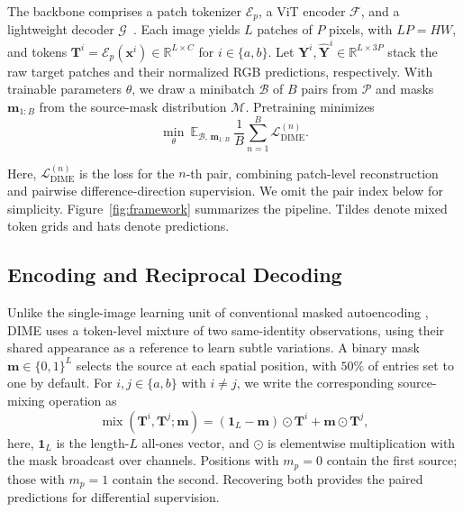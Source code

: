 \documentclass[10pt,journal,compsoc]{IEEEtran}
\begin{document}
The backbone comprises a patch tokenizer $\mathcal{E}_{p}$, a ViT encoder $\mathcal{F}$, and a lightweight decoder $\mathcal{G}$~\cite{he2022masked}. Each image yields $L$  patches of $P$ pixels, with $LP=HW$, and tokens $\mathbf{T}^{i}=\mathcal{E}_{p}(\mathbf{x}^{i})\in\mathbb{R}^{L\times C}$ for $i\in\{a,b\}$. Let $\mathbf{Y}^{i},\hat{\mathbf{Y}}^{i}\in\mathbb{R}^{L\times 3P}$ stack the raw target patches and their normalized RGB predictions, respectively. With trainable parameters $\theta$, we draw a minibatch $\mathcal{B}$ of $B$ pairs from $\mathcal{P}$ and masks $\mathbf{m}_{1:B}$ from the source-mask distribution $\mathcal{M}$. Pretraining minimizes
\begin{equation}
\min_{\theta}\ \mathbb{E}_{\mathcal{B},\,\mathbf{m}_{1:B}}\
\frac{1}{B}\sum_{n=1}^{B}\mathcal{L}_{\mathrm{DIME}}^{(n)}.
\label{eq:dime_optimization}
\end{equation}

Here, $\mathcal{L}_{\mathrm{DIME}}^{(n)}$ is the loss for the $n$-th pair, combining patch-level reconstruction and pairwise difference-direction supervision. We omit the pair index below for simplicity. Figure~\ref{fig:framework} summarizes the pipeline. Tildes denote mixed token grids and hats denote predictions.

\subsection{Encoding and Reciprocal Decoding}
\label{sec:dime_source_recovery}

Unlike the single-image learning unit of conventional masked autoencoding \cite{sun2023mae, he2022masked}, DIME uses a token-level mixture of two same-identity observations, using their shared appearance as a reference to learn subtle variations. A binary mask $\mathbf{m}\in\{0,1\}^{L}$ selects the source at each spatial position, with $50\%$ of entries set to one by default. For $i,j\in\{a,b\}$ with $i\neq j$, we write the corresponding source-mixing operation as
\begin{equation}
\operatorname{mix}(\mathbf{T}^{i},\mathbf{T}^{j};\mathbf{m})
=
(\mathbf{1}_{L}-\mathbf{m})\odot\mathbf{T}^{i}
+
\mathbf{m}\odot\mathbf{T}^{j},
\label{eq:dime_reciprocal_mix}
\end{equation}
here, $\mathbf{1}_{L}$ is the length-$L$ all-ones vector, and $\odot$ is elementwise multiplication with the mask broadcast over channels. Positions with $m_p=0$ contain the first source; those with $m_p=1$ contain the second. Recovering both provides the paired predictions for differential supervision.
\end{document}
